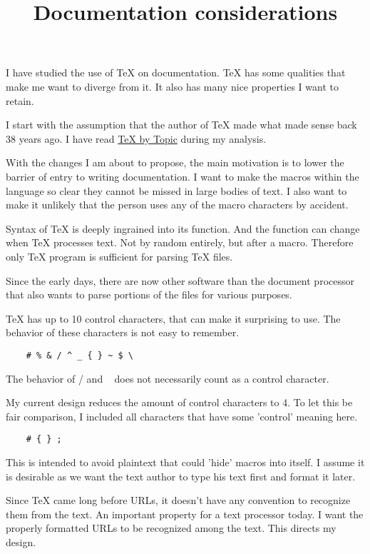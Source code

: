 \documentclass{article}
\begin{document}
\title{Documentation considerations}

I have studied the use of TeX on documentation. TeX has some
qualities that make me want to diverge from it. It also has
many nice properties I want to retain.

I start with the assumption that the author of TeX made what
made sense back 38 years ago. I have read
\href{http://eijkhout.net/texbytopic/texbytopic.html}{TeX by
Topic} during my analysis.

With the changes I am about to propose, the main motivation
is to lower the barrier of entry to writing documentation. I
want to make the macros within the language so clear they
cannot be missed in large bodies of text. I also want to
make it unlikely that the person uses any of the macro
characters by accident.

Syntax of TeX is deeply ingrained into its function. And the
function can change when TeX processes text. Not by random
entirely, but after a macro. Therefore only TeX program is
sufficient for parsing TeX files.

Since the early days, there are now other software than the
document processor that also wants to parse portions of the
files for various purposes.

TeX has up to 10 control characters, that can make it
surprising to use. The behavior of these characters is not
easy to remember.

\begin{verbatim}
    # % & / ^ _ { } ~ $ \
\end{verbatim}

The behavior of / and ~ does not necessarily count as a
control character.

My current design reduces the amount of control characters
to 4. To let this be fair comparison, I included all
characters that have some 'control' meaning here.

\begin{verbatim}
    # { } ;
\end{verbatim}

This is intended to avoid plaintext that could 'hide'
macros into itself. I assume it is desirable as we want
the text author to type his text first and format it later.

Since TeX came long before URLs, it doesn't have any
convention to recognize them from the text. An important
property for a text processor today. I want the properly
formatted URLs to be recognized among the text. This directs
my design.
\end{document}
